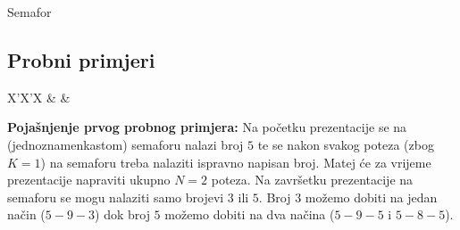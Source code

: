 \begin{statement}[
  problempoints=100,
  timelimit=5 sekundi,
  memorylimit=512 MiB,
]{Semafor}
\subsection*{Probni primjeri}
\begin{tabularx}{\textwidth}{X'X'X}
 &
 &
\end{tabularx}

\textbf{Pojašnjenje prvog probnog primjera:}
Na početku prezentacije se na (jednoznamenkastom) semaforu nalazi broj $5$ te se
nakon svakog poteza (zbog $K = 1$) na semaforu treba nalaziti ispravno
napisan broj. Matej će za vrijeme prezentacije napraviti ukupno $N=2$ poteza.
Na završetku prezentacije na semaforu se mogu nalaziti samo brojevi $3$ ili
$5$.  Broj $3$ možemo dobiti na jedan način ($5-9-3$) dok broj $5$ možemo
dobiti na dva načina ($5-9-5$ i $5-8-5$).

\end{statement}

